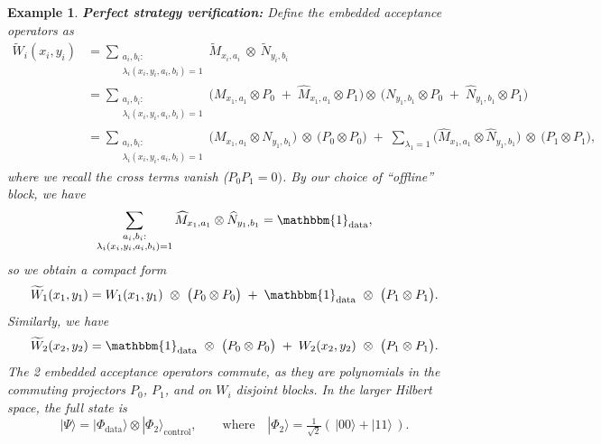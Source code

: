 \documentclass{article}
\newtheorem{example}{Example}
\begin{document}
\begin{example}
    \textbf{Perfect strategy verification:} Define the embedded acceptance operators as
    \begin{align*}
        \widetilde W_i(x_i,y_i)
        &=
        \sum_{\substack{a_i,b_i:\\\lambda_i(x_i,y_i,a_i,b_i)=1}} \widetilde M_{x_i,a_i}\ \otimes\ \widetilde N_{y_i,b_i} \\
        &= \sum_{\substack{a_i,b_i:\\\lambda_i(x_i,y_i,a_i,b_i)=1}} \Big(M_{x_1,a_1}\otimes P_0\;+\;\widehat M_{x_1,a_1}\otimes P_1\Big) \otimes\
        \Big(N_{y_1,b_1}\otimes P_0\;+\;\widehat N_{y_1,b_1}\otimes P_1\Big)\\
        &=  \sum_{\substack{a_i,b_i:\\\lambda_i(x_i,y_i,a_i,b_i)=1}} \Big(M_{x_1,a_1}\otimes N_{y_1,b_1}\Big)\ \otimes\ \big(P_0\otimes P_0\big)
        \;+\;\sum_{\lambda_1=1}
        \Big(\widehat M_{x_1,a_1}\otimes \widehat N_{y_1,b_1}\Big)\ \otimes\ \big(P_1\otimes P_1\big),
    \end{align*}
    where we recall the cross terms vanish ($P_0P_1=0)$. By our choice of ``offline'' block, we have  
    \begin{equation}
        \sum_{\substack{a_i,b_i:\\\lambda_i(x_i,y_i,a_i,b_i)=1}} \widehat M_{x_1,a_1}\otimes \widehat N_{y_1,b_1} = \mathbbm{1}_{\mathrm{data}},
    \end{equation}
    so we obtain a compact form 
    \begin{equation}\label{eq: w1-embedding}
        \widetilde W_1(x_1,y_1)=
        W_1(x_1,y_1)\ \otimes\ \big(P_0\otimes P_0\big)
        \;+\;\mathbbm{1}_{\mathrm{data}}\ \otimes\ \big(P_1\otimes P_1\big).
    \end{equation}
    Similarly, we have 
    \begin{equation}
     \widetilde W_2(x_2,y_2)=
      \mathbbm{1}_{\mathrm{data}}\ \otimes\ \big(P_0\otimes P_0\big)
      \;+\;W_2(x_2,y_2)\ \otimes\ \big(P_1\otimes P_1\big).
    \end{equation}
    The 2 embedded acceptance operators commute, as they are polynomials in the commuting projectors $P_0$, $P_1$, and on $W_i$ disjoint blocks. In the larger Hilbert space, the full state is
    \begin{equation}
          |\Psi\rangle = |\Phi_{\mathrm{data}}\rangle \otimes |\Phi_{2}\rangle_{\text{control}},\qquad\text{where} \quad |\Phi_{2}\rangle=\tfrac{1}{\sqrt{2}}(\,|00\rangle+|11\rangle\,).
    \end{equation}

\end{example}
\end{document}
